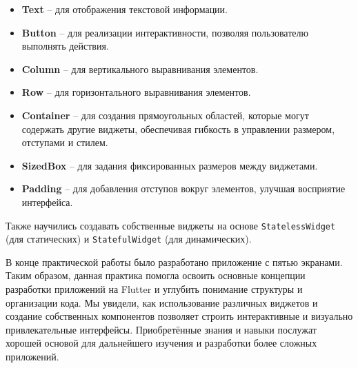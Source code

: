 \begin{itemize}
	\item \textbf{Text} -- для отображения текстовой информации.
	\item \textbf{Button} -- для реализации интерактивности,
		позволяя пользователю выполнять действия.
	\item \textbf{Column} -- для вертикального выравнивания элементов.
	\item \textbf{Row} -- для горизонтального выравнивания элементов.
	\item \textbf{Container} -- для создания прямоугольных областей,
		которые могут содержать другие виджеты,
		обеспечивая гибкость в управлении размером, отступами и стилем.
	\item \textbf{SizedBox} -- для задания фиксированных размеров
		между виджетами.
	\item \textbf{Padding} -- для добавления отступов вокруг элементов,
		улучшая восприятие интерфейса.
\end{itemize}

Также научились создавать собственные виджеты
на основе \texttt{StatelessWidget} (для статических)
и \texttt{StatefulWidget} (для динамических).

В конце практической работы было разработано приложение с пятью экранами.
Таким образом, данная практика помогла освоить основные концепции разработки
приложений на Flutter и углубить понимание структуры и организации кода.
Мы увидели, как использование различных виджетов
и создание собственных компонентов позволяет строить интерактивные
и визуально привлекательные интерфейсы.
Приобретённые знания и навыки послужат хорошей основой
для дальнейшего изучения и разработки более сложных приложений.


